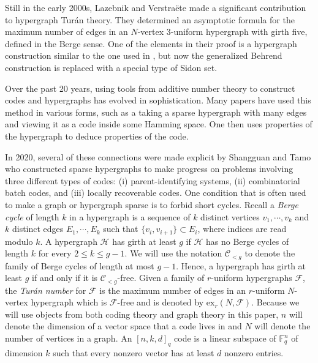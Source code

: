 \documentclass[12pt]{article}%
\begin{document}
Still in the early 2000s, Lazebnik and Verstra\"{e}te \cite{LV} made a significant contribution to hypergraph Tur\'{a}n theory.  They determined an asymptotic formula for the maximum number of edges in an $N$-vertex 3-uniform hypergraph with girth five, defined in the Berge sense.  One of the elements in their proof is a hypergraph construction similar to the one used 
in \cite{alon, alonFischerSzegedy}, 
but now the generalized Behrend construction is replaced with a special type of Sidon set.   

Over the past 20 years, using tools from additive number theory to construct codes and hypergraphs has 
evolved in sophistication.  Many papers have used this method in various forms, such as a taking a sparse hypergraph with many edges and viewing it as a code inside some Hamming space.  One then uses properties of the hypergraph to deduce properties of the code.    

In 2020, several of these connections were made explicit by Shangguan and Tamo \cite{ShangguanTamo1} who constructed sparse hypergraphs to make progress on problems involving three different types of codes: (i) parent-identifying systems,
(ii) combinatorial batch codes, and (iii) locally recoverable codes.  
One condition that is often used to make a graph or hypergraph sparse is to forbid short cycles.  
Recall a {\em Berge cycle} of length $k$ in a hypergraph is a sequence of $k$ distinct vertices $v_1,\cdots, v_k$ and $k$ distinct edges $E_1,\cdots, E_k$ such that $\{v_i, v_{i+1}\} \subset E_i$, where indices are read modulo $k$.  A hypergraph $\mathcal{H}$ has girth at least $g$ if $\mathcal{H}$ has no Berge cycles of length $k$ for every $2 \leq k \leq g-1$. We will use the notation $\mathcal{C}_{<g}$ to denote the family of Berge cycles of length at most $g-1$. Hence, a hypergraph has girth at least $g$ if and only if it is $\mathcal{C}_{< g}$-free. Given a family of $r$-uniform hypergraphs $\mathcal{F}$, the {\em Tur\'an number} for $\mathcal{F}$ is the maximum number of edges in an $r$-uniform $N$-vertex hypergraph which is $\mathcal{F}$-free and is denoted by $\mathrm{ex}_r(N, \mathcal{F})$. 
Because we will use objects from both coding theory and graph theory in this paper, $n$ will denote the dimension of a vector space that a code lives in and $N$ will denote the number of vertices in a graph. An $[n,k,d]_q$ code is a linear subspace of $\mathbb{F}_q^n$ of dimension $k$ such that every nonzero vector has at least $d$ nonzero entries. 
\end{document}
